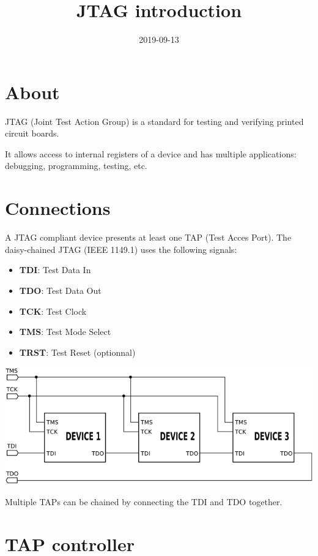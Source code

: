 \documentclass{article}
\title{JTAG introduction}
\date{2019-09-13}
\begin{document}
	\maketitle
	
	\section{About}
	
	JTAG (Joint Test Action Group) is a standard for testing and verifying printed circuit boards.
	
	It allows access to internal registers of a device and has multiple applications: debugging, programming, testing, etc.
	
	\section{Connections}
	
	A JTAG compliant device presents at least one TAP (Test Acces Port). The daisy-chained JTAG (IEEE 1149.1) uses the following signals:
	
	\begin{itemize}
	\item \textbf{TDI}: Test Data In
	\item \textbf{TDO}: Test Data Out
	\item \textbf{TCK}: Test Clock
	\item \textbf{TMS}: Test Mode Select
	\item \textbf{TRST}: Test Reset (optionnal)
	\end{itemize}
	
	\begin{center}
	\includegraphics[scale=0.7]{Jtag_chain.png}
	\end{center}
	
	Multiple TAPs can be chained by connecting the TDI and TDO together.
	
	\section{TAP controller}
	
\end{document}
